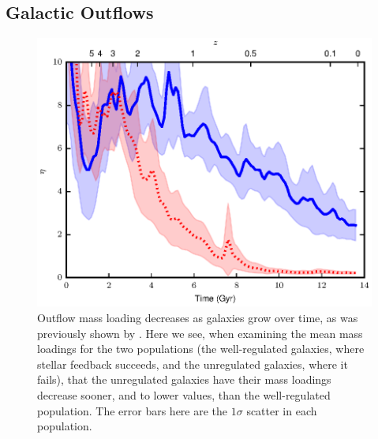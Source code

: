 \subsection{Galactic Outflows}
\begin{figure}
    \includegraphics[width=\textwidth]{figures3/massloading_time.eps}
    \caption[Outflow mass loading evolution in MUGS2]{Outflow mass loading
    decreases as galaxies grow over time, as was previously shown by
    \citet{Keller2015}.  Here we see, when examining the mean mass loadings for
    the two populations (the well-regulated galaxies, where stellar feedback
    succeeds, and the unregulated galaxies, where it fails), that the
    unregulated galaxies have their mass loadings decrease sooner, and to lower
    values, than the well-regulated population.  The error bars here are the
    $1\sigma$ scatter in each population.}
    \label{massloading_time}
\end{figure}
